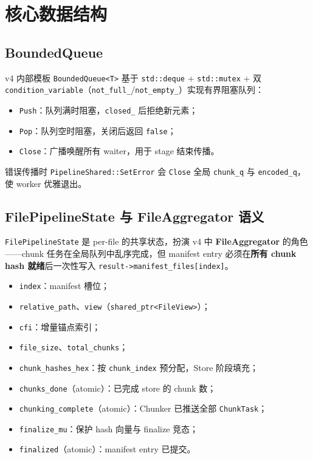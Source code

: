 \section{核心数据结构}

\subsection{BoundedQueue}

v4 内部模板 \texttt{BoundedQueue<T>} 基于 \texttt{std::deque} + \texttt{std::mutex} + 双 \texttt{condition\_variable}（\texttt{not\_full\_}/\texttt{not\_empty\_}）实现有界阻塞队列：
\begin{itemize}[nosep]
  \item \texttt{Push}：队列满时阻塞，\texttt{closed\_} 后拒绝新元素；
  \item \texttt{Pop}：队列空时阻塞，关闭后返回 \texttt{false}；
  \item \texttt{Close}：广播唤醒所有 waiter，用于 stage 结束传播。
\end{itemize}
错误传播时 \texttt{PipelineShared::SetError} 会 \texttt{Close} 全局 \texttt{chunk\_q} 与 \texttt{encoded\_q}，使 worker 优雅退出。

\subsection{FilePipelineState 与 FileAggregator 语义}

\texttt{FilePipelineState} 是 per-file 的共享状态，扮演 v4 中 \textbf{FileAggregator} 的角色——chunk 任务在全局队列中乱序完成，但 manifest entry 必须在\textbf{所有 chunk hash 就绪}后一次性写入 \texttt{result->manifest\_files[index]}。

\begin{structbox}[FilePipelineState 字段]
\begin{itemize}[nosep]
  \item \texttt{index}：manifest 槽位；
  \item \texttt{relative\_path}、\texttt{view}（\texttt{shared\_ptr<FileView>}）；
  \item \texttt{cfi}：增量锚点索引；
  \item \texttt{file\_size}、\texttt{total\_chunks}；
  \item \texttt{chunk\_hashes\_hex}：按 \texttt{chunk\_index} 预分配，Store 阶段填充；
  \item \texttt{chunks\_done}（atomic）：已完成 store 的 chunk 数；
  \item \texttt{chunking\_complete}（atomic）：Chunker 已推送全部 \texttt{ChunkTask}；
  \item \texttt{finalize\_mu}：保护 hash 向量与 finalize 竞态；
  \item \texttt{finalized}（atomic）：manifest entry 已提交。
\end{itemize}
\end{structbox}

